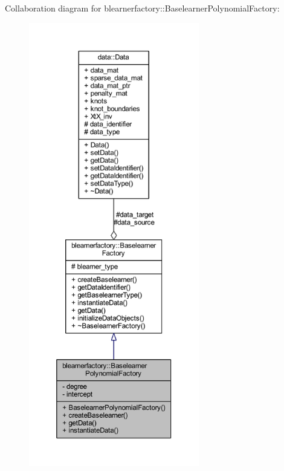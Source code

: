 Collaboration diagram for blearnerfactory\+:\+:Baselearner\+Polynomial\+Factory\+:\nopagebreak
\begin{figure}[H]
\begin{center}
\leavevmode
\includegraphics[height=550pt]{classblearnerfactory_1_1_baselearner_polynomial_factory__coll__graph}
\end{center}
\end{figure}
